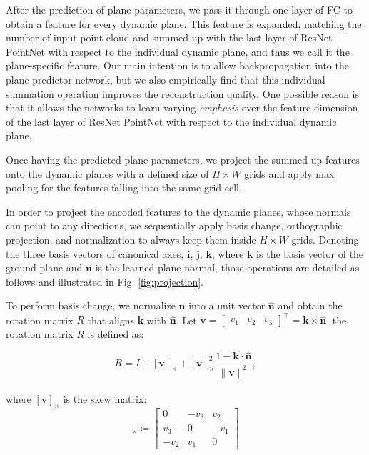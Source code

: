 \documentclass[10pt,twocolumn,letterpaper]{article}
\newcommand{\boldparagraph}[1]{\vspace{0.2cm}\noindent{\bf #1:} }
\begin{document}
After the prediction of plane parameters, we pass it through one layer of FC to obtain a feature for every dynamic plane.
This feature is expanded, matching the number of input point cloud and summed up with the last layer of ResNet PointNet with respect to the individual dynamic plane, and thus we call it the plane-specific feature.
Our main intention is to allow backpropagation into the plane predictor network, but we also empirically find that this individual summation operation improves the reconstruction quality. One possible reason is that it allows the networks to learn varying \emph{emphasis} over the feature dimension of the last layer of ResNet PointNet with respect to the individual dynamic plane. 

Once having the predicted plane parameters, we project the summed-up features onto the dynamic planes with a defined size of $H \times W$ grids and apply max pooling for the features falling into the same grid cell.

\boldparagraph{Planar projection} In order to project the encoded features to the dynamic planes, whose normals can point to any directions, we sequentially apply basis change, orthographic projection, and normalization to always keep them inside $H \times W$ grids. Denoting the three basis vectors of canonical axes, $\mathbf{i}$, $\mathbf{j}$, $\mathbf{k}$, where $\mathbf{k}$ is the basis vector of the ground plane and $\mathbf{n}$ is the learned plane normal, those operations are detailed as follows and illustrated in Fig. \ref{fig:projection}.

To perform basis change, we normalize $\mathbf{n}$ into a unit vector $\hat{\mathbf{n}}$ and obtain the rotation matrix $R$ that aligns $\mathbf{k}$ with $\hat{\mathbf{n}}$. Let $\mathbf{v} =\begin{bmatrix}
v_1 & v_2 & v_3
\end{bmatrix}^{\top} = \mathbf{k} \times \hat{\mathbf{n}}$, the rotation matrix $R$ is defined as:

\begin{equation}
  R = I + [\mathbf{v}]_\times + [\mathbf{v}]^{2}_\times \frac{1- \mathbf{k} \cdot \hat{\mathbf{n}} }{\lVert \mathbf{v} \rVert^2},
\label{eq:rotation}
\end{equation}\\
where $ [\mathbf{v}]_\times$ is the skew matrix:
\begin{equation}
 [\mathbf{v}]_\times \coloneqq \begin{bmatrix}
0 & -v_3 & v_2 \\
v_3 & 0 & -v_1 \\
-v_2 & v_1 & 0
\end{bmatrix}
\label{eq:skew}
\end{equation}
\end{document}
